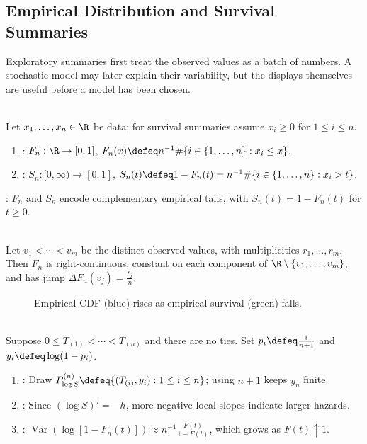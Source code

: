 \subsection{Empirical Distribution and Survival Summaries}

Exploratory summaries first treat the observed values as a batch of numbers.  A stochastic model may later explain their variability, but the displays themselves are useful before a model has been chosen.

\begin{definition} \label{def:empirical-cdf-and-survival-summary} \\
Let $x_1,\ldots,x_n\in\R$ be data; for survival summaries assume $x_i\geq0$ for $1\leq i\leq n$.
\begin{enumerate}[label=(\roman*)]
\setlength{\itemsep}{0pt}
\item {}: $F_n:\R\to[0,1]$, $F_n(x)\defeq n^{-1}\#\{i\in\{1,\ldots,n\}:x_i\leq x\}$.
\item {}: $S_n:[0,\infty)\to[0,1]$, $S_n(t)\defeq1-F_n(t)=n^{-1}\#\{i\in\{1,\ldots,n\}:x_i>t\}$.
\end{enumerate}
: $F_n$ and $S_n$ encode complementary empirical tails, with $S_n(t)=1-F_n(t)$ for $t\geq0$.
\end{definition}

\begin{remark} \label{rem:ecdf-step-convention} \\
Let $v_1<\cdots<v_m$ be the distinct observed values, with multiplicities $r_1,\ldots,r_m$. Then $F_n$ is right-continuous, constant on each component of $\R\setminus\{v_1,\ldots,v_m\}$, and has jump $\Delta F_n(v_j)=\frac{r_j}{n}$.
\end{remark}

\begin{figure}[H]
  \centering
  
  \caption{Empirical CDF (blue) rises as empirical survival (green) falls.}
  \label{fig:eda-ecdf-survival-steps}
\end{figure}

\begin{method} \label{meth:empirical-log-survival-plot} \\
Suppose $0\leq T_{(1)}<\cdots<T_{(n)}$ and there are no ties. Set $p_i\defeq\frac{i}{n+1}$ and $y_i\defeq\log(1-p_i)$.
\begin{enumerate}[label=(\roman*)]
\setlength{\itemsep}{0pt}
\item {}: Draw $P_{\log S}^{(n)}\defeq\{(T_{(i)},y_i):1\leq i\leq n\}$; using $n+1$ keeps $y_n$ finite.
\item {}: Since $(\log S)'=-h$, more negative local slopes indicate larger hazards.
\item {}: $\operatorname{Var}(\log[1-F_n(t)])\approx n^{-1}\frac{F(t)}{1-F(t)}$, which grows as $F(t)\uparrow1$.
\end{enumerate}
\end{method}
